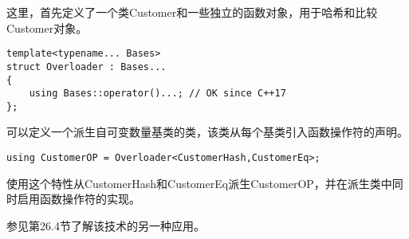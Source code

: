 这里，首先定义了一个类Customer和一些独立的函数对象，用于哈希和比较Customer对象。

\begin{lstlisting}[style=styleCXX]
template<typename... Bases>
struct Overloader : Bases...
{
	using Bases::operator()...; // OK since C++17
};
\end{lstlisting}

可以定义一个派生自可变数量基类的类，该类从每个基类引入函数操作符的声明。

\begin{lstlisting}[style=styleCXX]
using CustomerOP = Overloader<CustomerHash,CustomerEq>;
\end{lstlisting}

使用这个特性从CustomerHash和CustomerEq派生CustomerOP，并在派生类中同时启用函数操作符的实现。

参见第26.4节了解该技术的另一种应用。


























